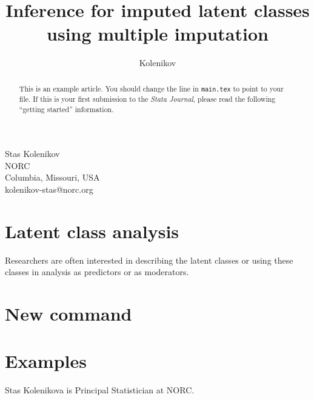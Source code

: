 
\author{Kolenikov}{%
  Stas Kolenikov\\NORC\\Columbia, Missouri, USA\\kolenikov-stas@norc.org
}
\title[Post-estimation for LCA via MI]{Inference for imputed latent classes using multiple imputation}
\maketitle

\begin{abstract}
This is an example article.  You should change the \verb++ line in
\texttt{main.tex} to point to your file.  If this is your first submission to
the {\sl Stata Journal}, please read the following ``getting started''
information.

\end{abstract}

\section{Latent class analysis}

Researchers are often interested in describing the latent classes
or using these classes in analysis as predictors or as moderators.


\section{New command}

\section{Examples}



\newpage







\begin{aboutauthors}
Stas Kolenikova is Principal Statistician at NORC.
\end{aboutauthors}

\endinput
